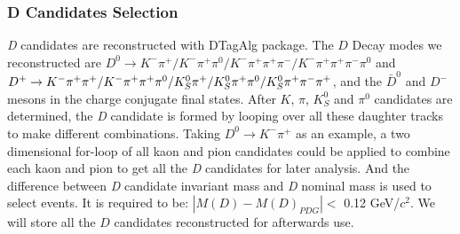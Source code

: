 \documentclass[aps,preprint,tightenlines,superscriptaddress,showpacs,byrevtex,amsmath,amssymb,nofloatfix]{revtex4}
\begin{document}
\subsubsection{D Candidates Selection}
\emph{D} candidates are reconstructed with DTagAlg package. The $D$ Decay modes we reconstructed are $D^{0} \rightarrow K^{-}\pi^{+}/K^{-}\pi^{+}\pi^{0}/K^{-}\pi^{+}\pi^{+}\pi^{-}/K^{-}\pi^{+}\pi^{+}\pi^{-}\pi^{0}$ and $D^{+} \rightarrow K^{-}\pi^{+}\pi^{+}/K^{-}\pi^{+}\pi^{+}\pi^{0}/ K^{0}_{S}\\\pi^{+}/K^{0}_{S}\pi^{+}\pi^{0}/K^{0}_{S}\pi^{+}\pi^{-}\pi^{+}$, and the $\bar{D}^{0}$ and $D^{-}$ mesons in the charge conjugate final states. After $K$, $\pi$, $K^{0}_{S}$ and $\pi^{0}$ candidates are determined, the \emph{D} candidate is formed by looping over all these daughter tracks to make different combinations. Taking $D^{0}\rightarrow K^{-}\pi^{+}$ as an example, a two dimensional for-loop of all kaon and pion candidates could be applied to combine each kaon and pion to get all the \emph{D} candidates for later analysis. And the difference between \emph{D} candidate invariant mass and \emph{D} nominal mass is used to select events. It is required to be: $|M(D)-M(D)_{PDG}| <$ 0.12 GeV/$c^{2}$. We will store all the $D$ candidates reconstructed for afterwards use.
\end{document}
